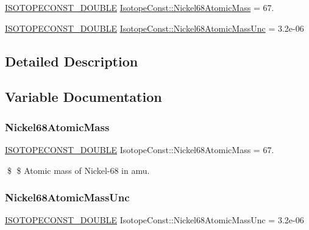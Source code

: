 \begin{DoxyCompactItemize}
\item 
\mbox{\hyperlink{group___isotope_const-_macros_ga8f45a7272ce02c0b4c65c44636ed719a}{I\+S\+O\+T\+O\+P\+E\+C\+O\+N\+S\+T\+\_\+\+D\+O\+U\+B\+LE}} \mbox{\hyperlink{group___isotope_const-_nickel-_ni68_gaac32470d2d164702d3edc62499f44e56}{Isotope\+Const\+::\+Nickel68\+Atomic\+Mass}} = 67.
\item 
\mbox{\hyperlink{group___isotope_const-_macros_ga8f45a7272ce02c0b4c65c44636ed719a}{I\+S\+O\+T\+O\+P\+E\+C\+O\+N\+S\+T\+\_\+\+D\+O\+U\+B\+LE}} \mbox{\hyperlink{group___isotope_const-_nickel-_ni68_ga80cd15a4a48559baee0e25bd51a82d5c}{Isotope\+Const\+::\+Nickel68\+Atomic\+Mass\+Unc}} = 3.\+2e-\/06
\end{DoxyCompactItemize}


\subsection{Detailed Description}


\subsection{Variable Documentation}
\mbox{\label{group___isotope_const-_nickel-_ni68_gaac32470d2d164702d3edc62499f44e56}} 
\subsubsection{\texorpdfstring{Nickel68\+Atomic\+Mass}{Nickel68AtomicMass}}
{\footnotesize\ttfamily \mbox{\hyperlink{group___isotope_const-_macros_ga8f45a7272ce02c0b4c65c44636ed719a}{I\+S\+O\+T\+O\+P\+E\+C\+O\+N\+S\+T\+\_\+\+D\+O\+U\+B\+LE}} Isotope\+Const\+::\+Nickel68\+Atomic\+Mass = 67.}

\$ \$ Atomic mass of Nickel-\/68 in amu. \mbox{\label{group___isotope_const-_nickel-_ni68_ga80cd15a4a48559baee0e25bd51a82d5c}} 
\subsubsection{\texorpdfstring{Nickel68\+Atomic\+Mass\+Unc}{Nickel68AtomicMassUnc}}
{\footnotesize\ttfamily \mbox{\hyperlink{group___isotope_const-_macros_ga8f45a7272ce02c0b4c65c44636ed719a}{I\+S\+O\+T\+O\+P\+E\+C\+O\+N\+S\+T\+\_\+\+D\+O\+U\+B\+LE}} Isotope\+Const\+::\+Nickel68\+Atomic\+Mass\+Unc = 3.\+2e-\/06}

